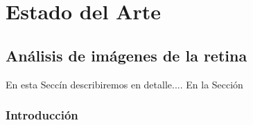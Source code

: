 
\chapter{Estado del Arte} %

\label{Chapter2} %


\section{An\'alisis  de im\'agenes de la retina}

En esta Secc\'in describiremos en detalle.... En la Secci\'on

	\subsection{Introducci\'on}


